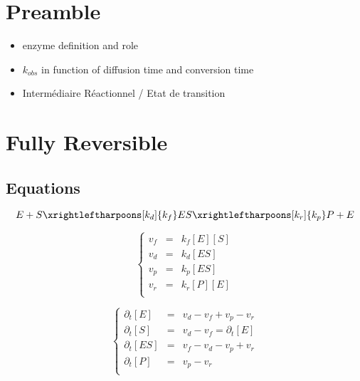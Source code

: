 \documentclass[aps,12pt]{revtex4}
\begin{document}
\section{Preamble}

\begin{itemize}
	\item enzyme definition and role
	\item $k_{obs}$ in function of diffusion time and conversion time
	\item Intermédiaire Réactionnel / Etat de transition
\end{itemize}

\section{Fully Reversible}



\subsection{Equations}

\begin{equation}
	E + S \xrightleftharpoons[k_d]{k_f} ES 
	\xrightleftharpoons[k_r]{k_p} P + E
\end{equation}

\begin{equation}
\left\lbrace
\begin{array}{rcl}
	v_f & =  & k_f [E][S] \\
	v_d & =  & k_d [ES]   \\
	v_p & =  & k_p [ES]   \\
	v_r & =  & k_r [P][E]  \\
\end{array}
\right.
\end{equation}

\begin{equation}
\left\lbrace
\begin{array}{rcl}
  \partial_t [E]  & = & v_d - v_f + v_p - v_r\\
  \partial_t [S]  & = & v_d - v_f = \partial_t [E]\\
  \partial_t [ES] & = & v_f - v_d - v_p + v_r\\ 
  \partial_t [P]  & = & v_p - v_r\\
\end{array}
\right.
\end{equation}
\end{document}
